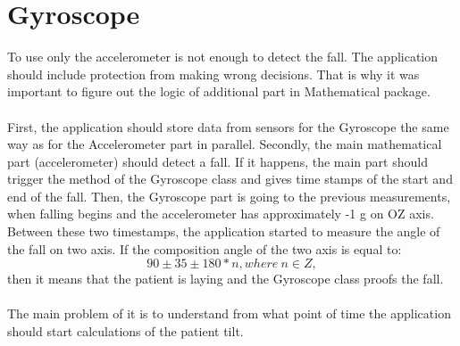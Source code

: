 \documentclass[12pt]{article}
\begin{document}
\section{Gyroscope}
To use only the accelerometer is not enough to detect the fall. The application should include protection from making wrong decisions. That is why it was important to figure out the logic of additional part in Mathematical package.\\\\
First, the application should store data from sensors for the Gyroscope the same way as for the Accelerometer part in parallel. Secondly, the main mathematical part (accelerometer) should detect a fall. If it happens, the main part should trigger the method of the Gyroscope class and gives time stamps of the start and end of the fall. Then, the Gyroscope part is going to the previous measurements, when falling begins and the accelerometer has approximately -1 g on OZ axis. Between these two timestamps, the application started to measure the angle of the fall on two axis. If the composition angle of the two axis is equal to: $$90 \pm 35 \pm 180 * n, where\ n \in Z,$$
then it means that the patient is laying and the Gyroscope class proofs the fall.\\\\
The main problem of it is to understand from what point of time the application should start calculations of the patient tilt.
\end{document}
